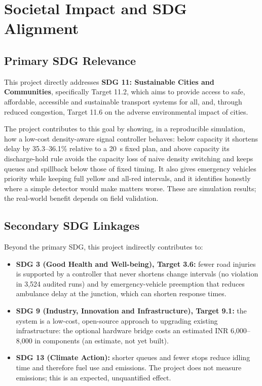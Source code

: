 \chapter{Societal Impact and SDG Alignment}
\label{chap:societal}

\section{Primary SDG Relevance}
This project directly addresses \textbf{SDG 11: Sustainable Cities and Communities}, specifically Target 11.2, which aims to provide access to safe, affordable, accessible and sustainable transport systems for all, and, through reduced congestion, Target 11.6 on the adverse environmental impact of cities.

The project contributes to this goal by showing, in a reproducible simulation, how a low-cost density-aware signal controller behaves: below capacity it shortens delay by 35.3--36.1\% relative to a 20~s fixed plan, and above capacity its discharge-hold rule avoids the capacity loss of naive density switching and keeps queues and spillback below those of fixed timing. It also gives emergency vehicles priority while keeping full yellow and all-red intervals, and it identifies honestly where a simple detector would make matters worse. These are simulation results; the real-world benefit depends on field validation.

\section{Secondary SDG Linkages}
Beyond the primary SDG, this project indirectly contributes to:
\begin{itemize}
  \item \textbf{SDG 3 (Good Health and Well-being), Target 3.6:} fewer road injuries is supported by a controller that never shortens change intervals (no violation in 3,524 audited runs) and by emergency-vehicle preemption that reduces ambulance delay at the junction, which can shorten response times.
  \item \textbf{SDG 9 (Industry, Innovation and Infrastructure), Target 9.1:} the system is a low-cost, open-source approach to upgrading existing infrastructure: the optional hardware bridge costs an estimated INR 6,000--8,000 in components (an estimate, not yet built).
  \item \textbf{SDG 13 (Climate Action):} shorter queues and fewer stops reduce idling time and therefore fuel use and emissions. The project does not measure emissions; this is an expected, unquantified effect.
\end{itemize}


